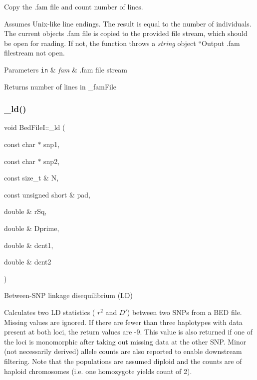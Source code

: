 Copy the .fam file and count number of lines. 

Assumes Unix-\/like line endings. The result is equal to the number of individuals. The current object\textquotesingle{}s .fam file is copied to the provided file stream, which should be open for raading. If not, the function throws a {\itshape string} object ``\+Output .fam filestream not open\textquotesingle{}\textquotesingle{}.


\begin{DoxyParams}[1]{Parameters}
\mbox{\tt in}  & {\em fam} & .fam file stream\\
\hline
\end{DoxyParams}
\begin{DoxyReturn}{Returns}
number of lines in {\ttfamily \+\_\+fam\+File} 
\end{DoxyReturn}
\mbox{\label{classsamp_files_1_1_bed_file_i_a9b6f8cbb9ae05056a7cd3d487fb26c30}} 
\subsubsection{\texorpdfstring{\+\_\+ld()}{\_ld()}\hspace{0.1cm}{\footnotesize\ttfamily [1/2]}}
{\footnotesize\ttfamily void Bed\+File\+I\+::\+\_\+ld (\begin{DoxyParamCaption}\item[{const char $\ast$}]{snp1,  }\item[{const char $\ast$}]{snp2,  }\item[{const size\+\_\+t \&}]{N,  }\item[{const unsigned short \&}]{pad,  }\item[{double \&}]{r\+Sq,  }\item[{double \&}]{Dprime,  }\item[{double \&}]{dcnt1,  }\item[{double \&}]{dcnt2 }\end{DoxyParamCaption})\hspace{0.3cm}{\ttfamily [protected]}}



Between-\/\+S\+NP linkage disequilibrium (LD) 

Calculates two LD statistics ( $ r^2 $ and $ D' $) between two S\+N\+Ps from a B\+ED file. Missing values are ignored. If there are fewer than three haplotypes with data present at both loci, the return values are -\/9. This value is also returned if one of the loci is monomorphic after taking out missing data at the other S\+NP. Minor (not necessarily derived) allele counts are also reported to enable downstream filtering. Note that the populations are assumed diploid and the counts are of haploid chromosomes (i.\+e. one homozygote yields count of 2).


